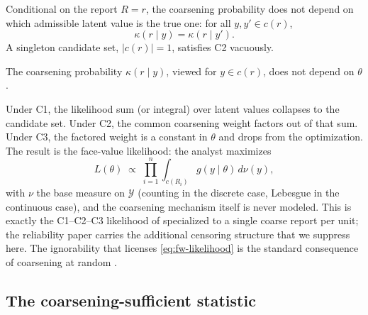 \begin{condition}
\label{cond:c2}
Conditional on the report $R = r$, the coarsening probability does not
depend on which admissible latent value is the true one: for all $y,
y' \in c(r)$,
\begin{equation}
  \kappa(r \mid y) = \kappa(r \mid y').
  \label{eq:fw-c2}
\end{equation}
A singleton candidate set, $|c(r)| = 1$, satisfies C2 vacuously.
\end{condition}

\begin{condition}
\label{cond:c3}
The coarsening probability $\kappa(r \mid y)$, viewed for $y \in
c(r)$, does not depend on $\theta$.
\end{condition}

Under C1, the likelihood sum (or integral) over latent values
collapses to the candidate set. Under C2, the common coarsening weight
factors out of that sum. Under C3, the factored weight is a constant
in $\theta$ and drops from the optimization. The result is the
face-value likelihood: the analyst maximizes
\begin{equation}
  L(\theta) \;\propto\; \prod_{i=1}^n \int_{c(R_i)} g(y \mid \theta)
    \, d\nu(y),
  \label{eq:fw-likelihood}
\end{equation}
with $\nu$ the base measure on $\mathcal{Y}$ (counting in the discrete
case, Lebesgue in the continuous case), and the coarsening mechanism
itself is never modeled. This is exactly the C1--C2--C3 likelihood of
\citet[Theorem on the C1--C2--C3 likelihood]{towell2026masked}
specialized to a single coarse report per unit; the reliability paper
carries the additional censoring structure that we suppress here. The
ignorability that licenses \eqref{eq:fw-likelihood} is the standard
consequence of coarsening at random
\citep[Ch.~6]{little2002statistical}.

\subsection{The coarsening-sufficient statistic}
\label{sec:css}

